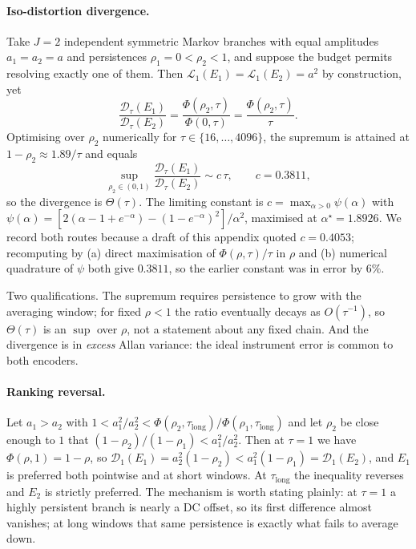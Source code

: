 \documentclass[11pt]{article}
\begin{document}
\paragraph{Iso-distortion divergence.} Take $J=2$ independent symmetric Markov branches with
equal amplitudes $a_1=a_2=a$ and persistences $\rho_1=0<\rho_2<1$, and suppose the budget
permits resolving exactly one of them. Then $\mathcal{L}_1(E_1)=\mathcal{L}_1(E_2)=a^{2}$ by
construction, yet
\begin{equation}
\frac{\mathcal{D}_\tau(E_1)}{\mathcal{D}_\tau(E_2)}
=\frac{\Phi(\rho_2,\tau)}{\Phi(0,\tau)}=\frac{\Phi(\rho_2,\tau)}{\tau}.
\end{equation}
Optimising over $\rho_2$ numerically for $\tau\in\{16,\dots,4096\}$, the supremum is
attained at $1-\rho_2\approx1.89/\tau$ and equals
\begin{equation}
\sup_{\rho_2\in(0,1)}\frac{\mathcal{D}_\tau(E_1)}{\mathcal{D}_\tau(E_2)}
\sim c\,\tau,\qquad c = 0.3811,
\end{equation}
so the divergence is $\Theta(\tau)$. The limiting constant is
$c=\max_{\alpha>0}\psi(\alpha)$ with
$\psi(\alpha)=[2(\alpha-1+e^{-\alpha})-(1-e^{-\alpha})^{2}]/\alpha^{2}$, maximised at
$\alpha^{\star}=1.8926$. We record both routes because a draft of this appendix quoted
$c=0.4053$; recomputing by (a) direct maximisation of $\Phi(\rho,\tau)/\tau$ in $\rho$ and
(b) numerical quadrature of $\psi$ both give $0.3811$, so the earlier constant was in error
by $6\%$.

Two qualifications. The supremum requires persistence to grow with the averaging window; for
fixed $\rho<1$ the ratio eventually decays as $O(\tau^{-1})$, so $\Theta(\tau)$ is an
$\sup$ over $\rho$, not a statement about any fixed chain. And the divergence is in
\emph{excess} Allan variance: the ideal instrument error is common to both encoders.

\paragraph{Ranking reversal.} Let $a_1>a_2$ with
$1<a_1^{2}/a_2^{2}<\Phi(\rho_2,\tau_{\mathrm{long}})/\Phi(\rho_1,\tau_{\mathrm{long}})$ and
let $\rho_2$ be close enough to $1$ that
$(1-\rho_2)/(1-\rho_1)<a_1^{2}/a_2^{2}$. Then at $\tau=1$ we have
$\Phi(\rho,1)=1-\rho$, so
$\mathcal{D}_1(E_1)=a_2^{2}(1-\rho_2)<a_1^{2}(1-\rho_1)=\mathcal{D}_1(E_2)$, and $E_1$ is
preferred both pointwise and at short windows. At $\tau_{\mathrm{long}}$ the inequality
reverses and $E_2$ is strictly preferred. The mechanism is worth stating plainly: at
$\tau=1$ a highly persistent branch is nearly a DC offset, so its first difference almost
vanishes; at long windows that same persistence is exactly what fails to average down.
\end{document}
